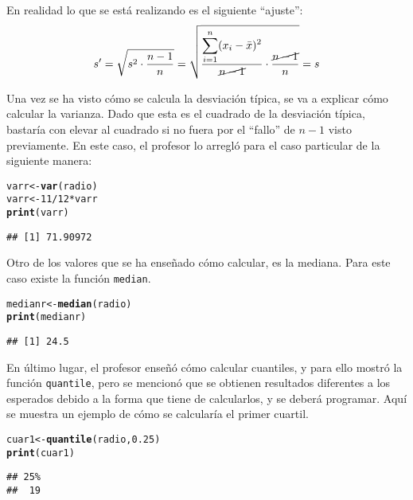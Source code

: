 \documentclass[12pt]{report}\usepackage[]{graphicx}\usepackage[dvipsnames]{xcolor}
\makeatletter
\newcommand{\hlnum}[1]{\textcolor[rgb]{0.686,0.059,0.569}{#1}}%
\newcommand{\hlopt}[1]{\textcolor[rgb]{0,0,0}{#1}}%
\newcommand{\hlstd}[1]{\textcolor[rgb]{0.345,0.345,0.345}{#1}}%
\newcommand{\hlkwb}[1]{\textcolor[rgb]{0.69,0.353,0.396}{#1}}%
\newcommand{\hlkwd}[1]{\textcolor[rgb]{0.737,0.353,0.396}{\textbf{#1}}}%
\newenvironment{kframe}{%
 \def\at@end@of@kframe{}%
 \ifinner\ifhmode%
  \def\at@end@of@kframe{\end{minipage}}%
  \begin{minipage}{\columnwidth}%
 \fi\fi%
 \def\FrameCommand##1{\hskip\@totalleftmargin \hskip-\fboxsep
 \colorbox{shadecolor}{##1}\hskip-\fboxsep
     \hskip-\linewidth \hskip-\@totalleftmargin \hskip\columnwidth}%
 \MakeFramed {\advance\hsize-\width
   \@totalleftmargin\z@ \linewidth\hsize
   \@setminipage}}%
 {\par\unskip\endMakeFramed%
 \at@end@of@kframe}
\newenvironment{knitrout}{}{} %
\makeatother
\begin{document}
			En realidad lo que se está realizando es el siguiente ``ajuste'': 
			$$
			s' = \sqrt{s^2\cdot\frac{n-1}{n}} = \sqrt{\frac{\displaystyle\sum_{i=1}^n(x_i - \bar{x})^2}{\cancel{n-1}}\cdot\frac{\cancel{n-1}}{n}} = s
			$$
			
			Una vez se ha visto cómo se calcula la desviación típica, se va a explicar cómo calcular la varianza. Dado que esta es el cuadrado de la desviación típica, bastaría con elevar al cuadrado si no fuera por el ``fallo'' de $n-1$ visto previamente. En este caso, el profesor lo arregló para el caso particular de la siguiente manera:
			
\begin{knitrout}
\color{fgcolor}\begin{kframe}
\begin{alltt}
\hlstd{varr} \hlkwb{<-} \hlkwd{var}\hlstd{(radio)}
\hlstd{varr} \hlkwb{<-} \hlnum{11}\hlopt{/}\hlnum{12} \hlopt{*} \hlstd{varr}
\hlkwd{print}\hlstd{(varr)}
\end{alltt}
\begin{verbatim}
## [1] 71.90972
\end{verbatim}
\end{kframe}
\end{knitrout}
			
			Otro de los valores que se ha enseñado cómo calcular, es la mediana. Para este caso existe la función \texttt{median}. 
			
\begin{knitrout}
\color{fgcolor}\begin{kframe}
\begin{alltt}
\hlstd{medianr} \hlkwb{<-} \hlkwd{median}\hlstd{(radio)}
\hlkwd{print}\hlstd{(medianr)}
\end{alltt}
\begin{verbatim}
## [1] 24.5
\end{verbatim}
\end{kframe}
\end{knitrout}
			
			En último lugar, el profesor enseñó cómo calcular cuantiles, y para ello mostró la función \texttt{quantile}, pero se mencionó que se obtienen resultados diferentes a los esperados debido a la forma que tiene de calcularlos, y se deberá programar. Aquí se muestra un ejemplo de cómo se calcularía el primer cuartil. 
			
\begin{knitrout}
\color{fgcolor}\begin{kframe}
\begin{alltt}
\hlstd{cuar1} \hlkwb{<-} \hlkwd{quantile}\hlstd{(radio,} \hlnum{0.25}\hlstd{)}
\hlkwd{print}\hlstd{(cuar1)}
\end{alltt}
\begin{verbatim}
## 25% 
##  19
\end{verbatim}
\end{kframe}
\end{knitrout}
\end{document}
